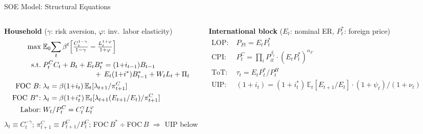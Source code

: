 \documentclass[aspectratio=169, 10pt]{beamer}
\begin{document}
\begin{frame}{SOE Model: Structural Equations}

\begin{columns}[t]

{\footnotesize \textbf{Household} ($\gamma$: risk aversion, $\varphi$: inv.\ labor elasticity)}
\vspace{-3pt}
{\scriptsize\begin{align*}
\max\; & \mathbb{E}_0\!\sum_t \beta^t\!\left[\tfrac{C_t^{1-\gamma}}{1-\gamma} - \tfrac{L_t^{1+\varphi}}{1+\varphi}\right] \\[0pt]
\text{s.t.}\; & P^C_t C_t + B_t + E_t B^*_t = (1{+}i_{t-1})B_{t-1} \\[-2pt]
              & \hspace{2.5cm}+\, E_t(1{+}i^*)B^*_{t-1} + W_t L_t + \Pi_t \\[0pt]
\text{FOC $B$:}\; & \lambda_t = \beta(1{+}i_t)\,\mathbb{E}_t[\lambda_{t+1}/\pi^C_{t+1}] \\[0pt]
\text{FOC $B^*$:}\; & \lambda_t = \beta(1{+}i^*_t)\,\mathbb{E}_t[\lambda_{t+1}(E_{t+1}/E_t)/\pi^C_{t+1}] \\[0pt]
\text{Labor:}\; & W_t/P^C_t = C_t^{\gamma} L_t^{\varphi}
\end{align*}}
\vspace{-5pt}
{\scriptsize $\lambda_t{\equiv}C_t^{-\gamma}$;\; $\pi^C_{t+1}{\equiv}P^C_{t+1}/P^C_t$;\; FOC\,$B^*\div$FOC\,$B$ $\Rightarrow$ UIP below}

\vspace{3pt}
{\footnotesize \textbf{International block} ($E_t$: nominal ER, $P^*_t$: foreign price)}
\vspace{-3pt}
{\scriptsize\begin{align*}
\text{LOP:}\; & P_{Ft} = E_t P^*_t \\[0pt]
\text{CPI:}\; & P^C_t = \textstyle\prod_i P_{it}^{\beta_i}\cdot (E_t P^*_t)^{\alpha_F} \\[0pt]
\text{ToT:}\; & \tau_t = E_t P^*_t / P^H_t \\[0pt]
\text{UIP:}\; & (1{+}i_t) = (1{+}i^*_t)\,\mathbb{E}_t[E_{t+1}/E_t]\cdot(1{+}\psi_t)/(1{+}\nu_t)
\end{align*}}



\end{columns}
\end{frame}
\end{document}
